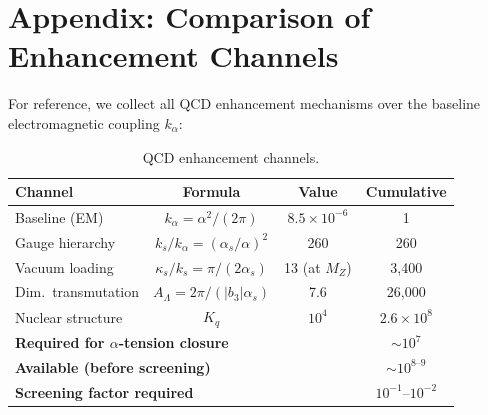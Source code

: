 \documentclass[11pt,letterpaper]{article}
\newcommand{\kalpha}{k_\alpha}
\theoremstyle{definition}
\begin{document}
\section*{Appendix: Comparison of Enhancement Channels}

For reference, we collect all QCD enhancement mechanisms over the
baseline electromagnetic coupling $\kalpha$:

\begin{table}[h]
\centering
\caption{QCD enhancement channels.}\label{tab:channels}
\renewcommand{\arraystretch}{1.3}
\begin{tabular}{lccc}
\toprule
Channel & Formula & Value & Cumulative \\
\midrule
Baseline (EM) & $\kalpha = \alpha^2/(2\pi)$ & $8.5 \times 10^{-6}$ & 1 \\
Gauge hierarchy & $k_s/\kalpha = (\alpha_s/\alpha)^2$ & 260 & 260 \\
Vacuum loading & $\kappa_s/k_s = \pi/(2\alpha_s)$ & 13 (at $M_Z$) & 3,400 \\
Dim.\ transmutation & $A_\Lambda = 2\pi/(|b_3|\alpha_s)$ & 7.6 & 26,000 \\
Nuclear structure & $K_q$ & $10^4$ & $2.6 \times 10^8$ \\
\midrule
\multicolumn{3}{l}{\textbf{Required for $\alpha$-tension closure}}
& $\sim 10^7$ \\
\multicolumn{3}{l}{\textbf{Available (before screening)}}
& $\sim 10^{8\text{--}9}$ \\
\multicolumn{3}{l}{\textbf{Screening factor required}}
& $10^{-1}\text{--}10^{-2}$ \\
\bottomrule
\end{tabular}
\end{table}
\end{document}
